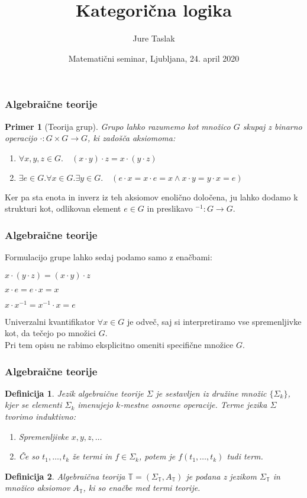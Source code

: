 \documentclass{beamer}
\title[Kategorična logika]{Kategorična logika}
\author{Jure Taslak}
\date{Matematični seminar, Ljubljana, 24. april 2020}
\newtheorem{definicija}{Definicija}
\newtheorem{primer}{Primer}
\begin{document}
\frame{\titlepage}

\begin{frame}
\frametitle{Algebraične teorije}
\begin{primer}[Teorija grup]
Grupo lahko razumemo kot množico $G$ skupaj z binarno operacijo $\cdot : G \times G \to G$, ki zadošča aksiomoma:
\pause
\begin{enumerate}
\item $\forall x,y,z \in G . \quad (x\cdot y) \cdot z = x \cdot (y \cdot z)$
\item $\exists e \in G . \forall x \in G . \exists y \in G . \quad (e \cdot x = x \cdot e = x \wedge x \cdot y = y \cdot x = e)$
\end{enumerate}
\end{primer}
\pause
Ker pa sta enota in inverz iz teh aksiomov enolično določena, ju lahko dodamo k strukturi kot, odlikovan element $e \in G$ in preslikavo $^{-1} : G \to G$.
\end{frame}


\begin{frame}
\frametitle{Algebraične teorije}
Formulacijo grupe lahko sedaj podamo samo z enačbami:
\vspace{1em}
\begin{description}
\item $x \cdot (y \cdot z) = (x \cdot y) \cdot z$
\item $x \cdot e = e \cdot x = x$
\item $x \cdot x^{-1} = x^{-1} \cdot x = e$
\end{description}
\vspace{1em}
\pause
Univerzalni kvantifikator $\forall x \in G$ je odveč, saj si interpretiramo vse spremenljivke kot, da tečejo po množici $G$. \\
Pri tem opisu ne rabimo eksplicitno omeniti specifične množice $G$.
\end{frame}

\begin{frame}
\frametitle{Algebraične teorije}
\begin{definicija}
Jezik algebraične teorije $\Sigma$ je sestavljen iz družine množic $\lbrace \Sigma_k \rbrace$, kjer se elementi $\Sigma_k$ imenujejo $k$-mestne osnovne operacije. Terme jezika $\Sigma$ tvorimo induktivno:
\begin{enumerate}
\item Spremenljivke $x,y,z, \ldots$
\item Če so $t_1, \ldots, t_k$ že termi in $f \in \Sigma_k$, potem je $f(t_1,\ldots, t_k)$ tudi term.
\end{enumerate}
\end{definicija}
\pause
\begin{definicija}
\emph{Algebraična teorija} $\mathbb{T} = (\Sigma_\mathbb{T}, A_\mathbb{T})$ je podana z jezikom $\Sigma_\mathbb{T}$ in množico aksiomov $A_\mathbb{T}$, ki so enačbe med termi teorije.
\end{definicija}
\end{frame}
\end{document}
